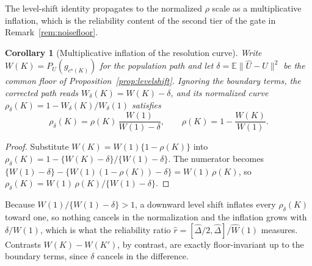 \documentclass[11pt]{article}
\newtheorem{corollary}{Corollary}
\newcommand{\E}{\mathbb E}
\newcommand{\hU}{\widehat U}
\newcommand{\norm}[1]{\lVert #1\rVert}
\begin{document}
The level-shift identity propagates to the normalized $\rho$ scale as a multiplicative inflation, which is the reliability content of the second tier of the gate in Remark~\ref{rem:noisefloor}.

\begin{corollary}[Multiplicative inflation of the resolution curve]\label{cor:levelshift_rho}
Write $W(K)=P_U(g_{c^\star(K)})$ for the population path and let $\delta=\E\norm{\hU-U}^2$ be the common floor of Proposition~\ref{prop:levelshift}. Ignoring the boundary terms, the corrected path reads $W_\delta(K)=W(K)-\delta$, and its normalized curve $\rho_\delta(K)=1-W_\delta(K)/W_\delta(1)$ satisfies
\begin{equation}\label{eq:levelshift_rho}
\rho_\delta(K)=\rho(K)\,\frac{W(1)}{W(1)-\delta},\qquad \rho(K)=1-\frac{W(K)}{W(1)} .
\end{equation}
\end{corollary}

\begin{proof}
Substitute $W(K)=W(1)\{1-\rho(K)\}$ into $\rho_\delta(K)=1-\{W(K)-\delta\}/\{W(1)-\delta\}$. The numerator becomes $\{W(1)-\delta\}-\{W(1)(1-\rho(K))-\delta\}=W(1)\,\rho(K)$, so $\rho_\delta(K)=W(1)\,\rho(K)/\{W(1)-\delta\}$.
\end{proof}

Because $W(1)/\{W(1)-\delta\}>1$, a downward level shift inflates every $\rho_\delta(K)$ toward one, so nothing cancels in the normalization and the inflation grows with $\delta/W(1)$, which is what the reliability ratio $\hat r=[\widehat\Delta/2,\widehat\Delta]/\widehat W(1)$ measures. Contrasts $W(K)-W(K')$, by contrast, are exactly floor-invariant up to the boundary terms, since $\delta$ cancels in the difference.
\end{document}
